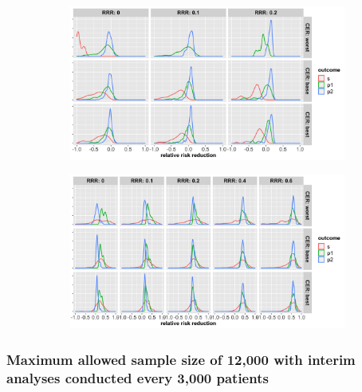 \documentclass[]{article}
\begin{document}
\begin{figure}
\centering
  \caption{Distribution of relative risk reduction estimates after stopping early for (a) futility; (b) superiority.
  Results are presented for the three control event rates by rows, relative risk reductions (by columns) and the
  three outcomes (legend).}
  \begin{subfigure}{0.8\textwidth}
    \centering
    \caption{}
    \includegraphics{../p1_plots/batch_size_nb_2000/RRRhat_fut_p1.png}
  \end{subfigure}
  \bigbreak
  \begin{subfigure}{0.8\textwidth}
    \centering
    \caption{}
    \includegraphics{../p1_plots/batch_size_nb_2000/RRRhat_sup_p1.png}
  \end{subfigure}
\end{figure}

\clearpage

\hypertarget{maximum-allowed-sample-size-of-12000-with-interim-analyses-conducted-every-3000-patients}{%
\subsubsection{Maximum allowed sample size of 12,000 with interim
analyses conducted every 3,000
patients}\label{maximum-allowed-sample-size-of-12000-with-interim-analyses-conducted-every-3000-patients}}
\end{document}

